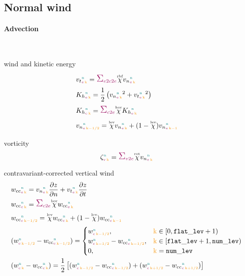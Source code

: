 \clearpage
\subsection{Normal wind}
\label{sub:normal_wind}


\paragraph{Advection}\

wind and kinetic energy
\begin{align}
  &\vt{\n}{\e}{\k} = \sum_{\offProv{e2c2e}} \Wrbf \vn{\n}{\e}{\k} \\
  &\kinehori{\n}{\e}{\k} = \frac{1}{2} \left( \vn{\n}{\e}{\k}^2 + \vt{\n}{\e}{\k}^2 \right) \\
  &\kinehori{\n}{\c}{\k} = \sum_{\offProv{c2e}} \Whor \kinehori{\n}{\e}{\k} \\
  &\vn{\n}{\e}{\k-1/2} = \Wlev \vn{\n}{\e}{\k} + (1 - \Wlev) \vn{\n}{\e}{\k-1} \\
\end{align}

vorticity
\begin{equation}
  \vortvert{\n}{\v}{\k} = \sum_{\offProv{v2e}} \Crot \vn{\n}{\e}{\k}
\end{equation}

contravariant-corrected vertical wind
\begin{align}
  &\wcc{\n}{\e}{\k} = \vn{\n}{\e}{\k} \pdxn{z} + \vt{\n}{\e}{\k} \pdxt{z} \\
  &\wcc{\n}{\c}{\k} = \sum_{\offProv{c2e}} \Whor \wcc{\n}{\e}{\k} \\
  &\wcc{\n}{\c}{\k-1/2} = \Wlev \wcc{\n}{\c}{\k} + (1 - \Wlev) \wcc{\n}{\c}{\k-1} \\
  &(\w{\n}{\c}{\k-1/2} - \wcc{\n}{\c}{\k-1/2}) =
    \begin{cases}
      \w{\n}{\c}{\k-1/2},                        & \k \in [0, \nflatlev+1)     \\
      \w{\n}{\c}{\k-1/2} - \wcc{\n}{\c}{\k-1/2}, & \k \in [\nflatlev+1, \nlev) \\
      0,                                         & \k = \nlev
    \end{cases}\\
  &(\w{\n}{\c}{\k} - \wcc{\n}{\c}{\k}) = \frac{1}{2} \left[(\w{\n}{\c}{\k-1/2} - \wcc{\n}{\c}{\k-1/2})
                                                         + (\w{\n}{\c}{\k+1/2} - \wcc{\n}{\c}{\k+1/2})\right] \\
\end{align}

